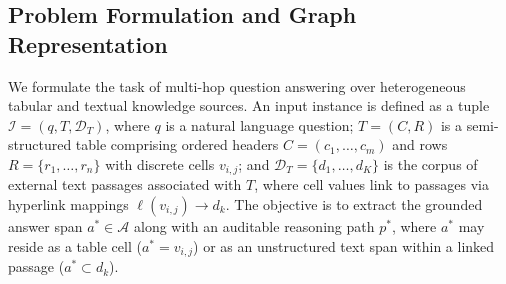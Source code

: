\documentclass[runningheads]{llncs}
\begin{document}
\subsection{Problem Formulation and Graph Representation}
\label{sec:formulation}
We formulate the task of multi-hop question answering over heterogeneous tabular and textual knowledge sources. An input instance is defined as a tuple $\mathcal{I} = (q, T, \mathcal{D}_T)$, where $q$ is a natural language question; $T = (C, R)$ is a semi-structured table comprising ordered headers $C = (c_1, \dots, c_m)$ and rows $R = \{r_1, \dots, r_n\}$ with discrete cells $v_{i,j}$; and $\mathcal{D}_T = \{d_1, \dots, d_K\}$ is the corpus of external text passages associated with $T$, where cell values link to passages via hyperlink mappings $\ell(v_{i,j}) \rightarrow d_k$. The objective is to extract the grounded answer span $a^* \in \mathcal{A}$ along with an auditable reasoning path $p^*$, where $a^*$ may reside as a table cell ($a^* = v_{i,j}$) or as an unstructured text span within a linked passage ($a^* \subset d_k$).
\end{document}
